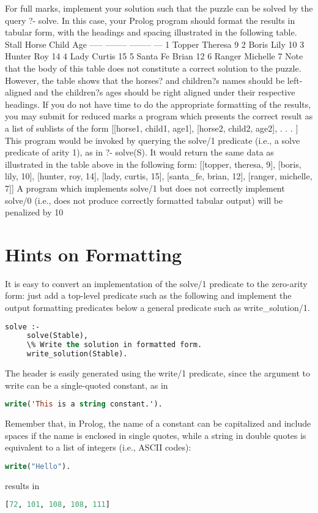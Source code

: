 \documentclass[12pt,info]{asg}
\begin{document}
For full marks, implement your solution such that the puzzle can be solved by the query
?- solve.
In this case, your Prolog program should format the results in tabular form, with the headings and spacing illustrated in the following table.
   Stall   Horse     Child    Age
   -----  --------  --------  ---
     1    Topper    Theresa     9
     2    Boris     Lily       10
     3    Hunter    Roy        14
     4    Lady      Curtis     15
     5    Santa Fe  Brian      12
     6    Ranger    Michelle    7
Note that the body of this table does not constitute a correct solution to the puzzle. However, the table shows that the horses? and children?s names should be left-aligned and the children?s ages should be right aligned under their respective headings.
If you do not have time to do the appropriate formatting of the results, you may submit for reduced marks a program which presents the correct result as a list of sublists of the form
[[horse1, child1, age1], [horse2, child2, age2], . . . ]
This program would be invoked by querying the solve/1 predicate (i.e., a solve predicate of
arity 1), as in
?- solve(S).
It would return the same data as illustrated in the table above in the following form:
   [[topper, theresa, 9], [boris, lily, 10], [hunter, roy, 14],
[lady, curtis, 15], [santa_fe, brian, 12], [ranger, michelle, 7]]
A program which implements solve/1 but does not correctly implement solve/0 (i.e., does not produce correctly formatted tabular output) will be penalized by 10%


\section*{Hints on Formatting}
It is easy to convert an implementation of the solve/1 predicate to the zero-arity form: just add a top-level predicate such as the following and implement the output formatting predicates below a general predicate such as write_solution/1.
\begin{lstlisting}[language=Lisp]
   solve :-
     solve(Stable),
     \% Write the solution in formatted form.
     write_solution(Stable).
\end{lstlisting}
The header is easily generated using the write/1 predicate, since the argument to write can be a single-quoted constant, as in

\begin{lstlisting}[language=Lisp]
 write('This is a string constant.').
\end{lstlisting}

Remember that, in Prolog, the name of a constant can be capitalized and include spaces if the name is enclosed in single quotes, while a string in double quotes is equivalent to a list of integers (i.e., ASCII codes):
\begin{lstlisting}[language=Lisp]
   write("Hello").
\end{lstlisting}
results in
\begin{lstlisting}[language=Lisp]
[72, 101, 108, 108, 111]
\end{lstlisting}
\end{document}
